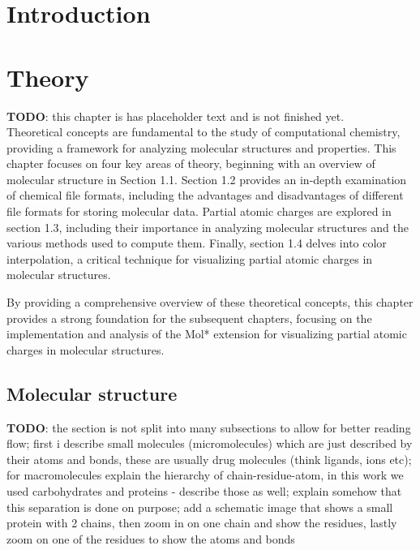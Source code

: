 \documentclass[
  digital,     %
  oneside,     %
  nosansbold,  %
  nocolorbold, %
  lof,         %
  lot,         %
]{fithesis4}
\begin{document}
\chapter*{Introduction}

\chapter{Theory}
\label{chapter:theory}

\textbf{TODO}: this chapter is has placeholder text and is not finished yet. \\

Theoretical concepts are fundamental to the study of computational chemistry, providing a framework for analyzing molecular structures and properties. This chapter focuses on four key areas of theory, beginning with an overview of molecular structure in Section 1.1. Section 1.2 provides an in-depth examination of chemical file formats, including the advantages and disadvantages of different file formats for storing molecular data. Partial atomic charges are explored in section 1.3, including their importance in analyzing molecular structures and the various methods used to compute them. Finally, section 1.4 delves into color interpolation, a critical technique for visualizing partial atomic charges in molecular structures.

By providing a comprehensive overview of these theoretical concepts, this chapter provides a strong foundation for the subsequent chapters, focusing on the implementation and analysis of the Mol* extension for visualizing partial atomic charges in molecular structures.

\section{Molecular structure}
\label{section:molecular_structure}

\textbf{TODO}: the section is not split into many subsections to allow for better reading flow; first i describe small molecules (micromolecules) which are just described by their atoms and bonds, these are usually drug molecules (think ligands, ions etc); for macromolecules explain the hierarchy of chain-residue-atom, in this work we used carbohydrates and proteins - describe those as well; explain somehow that this separation is done on purpose; add a schematic image that shows a small protein with 2 chains, then zoom in on one chain and show the residues, lastly zoom on one of the residues to show the atoms and bonds \\
\end{document}
